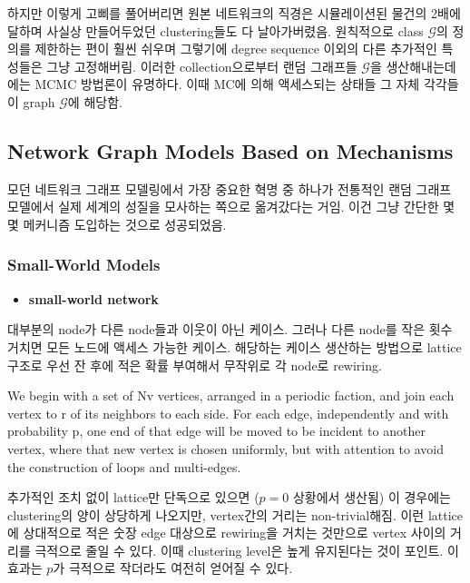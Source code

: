 \documentclass[
]{book}
\providecommand{\tightlist}{%
  \setlength{\itemsep}{0pt}\setlength{\parskip}{0pt}}
\begin{document}
{{{하지만 이렇게 고삐를 풀어버리면 원본 네트워크의 직경은 시뮬레이션된 물건의 2배에 달하며 사실상 만들어두었던 clustering들도 다 날아가버렸음. 원칙적으로 class \(\mathcal G\)의 정의를 제한하는 편이 훨씬 쉬우며 그렇기에 degree sequence 이외의 다른 추가적인 특성들은 그냥 고정해버림. 이러한 collection으로부터 랜덤 그래프들 \(\mathcal G\)을 생산해내는데에는 MCMC 방법론이 유명하다. 이때 MC에 의해 액세스되는 상태들 그 자체 각각들이 graph \(\mathcal G\)에 해당함.

\hypertarget{network-graph-models-based-on-mechanisms}{%
\subsection{Network Graph Models Based on Mechanisms}\label{network-graph-models-based-on-mechanisms}}

모던 네트워크 그래프 모델링에서 가장 중요한 혁명 중 하나가 전통적인 랜덤 그래프 모델에서 실제 세계의 성질을 모사하는 쪽으로 옮겨갔다는 거임. 이건 그냥 간단한 몇몇 메커니즘 도입하는 것으로 성공되었음.

\hypertarget{small-world-models}{%
\subsubsection{Small-World Models}\label{small-world-models}}

\begin{itemize}
\tightlist
\item
  \textbf{small-world network}
\end{itemize}

대부분의 node가 다른 node들과 이웃이 아닌 케이스. 그러나 다른 node를 작은 횟수 거치면 모든 노드에 액세스 가능한 케이스. 해당하는 케이스 생산하는 방법으로 lattice 구조로 우선 잔 후에 적은 확률 부여해서 무작위로 각 node로 rewiring.

We begin with a set of Nv vertices, arranged in a periodic faction, and join each vertex to r of its neighbors to each side. For each edge, independently and with probability p, one end of that edge will be moved to be incident to another vertex, where that new vertex is chosen uniformly, but with attention to avoid the construction of loops and multi-edges.

추가적인 조치 없이 lattice만 단독으로 있으면 (\(p=0\) 상황에서 생산됨) 이 경우에는 clustering의 양이 상당하게 나오지만, vertex간의 거리는 non-trivial해짐. 이런 lattice에 상대적으로 적은 숫장 edge 대상으로 rewiring을 거치는 것만으로 vertex 사이의 거리를 극적으로 줄일 수 있다. 이때 clustering level은 높게 유지된다는 것이 포인트. 이 효과는 \(p\)가 극적으로 작더라도 여전히 얻어질 수 있다.

}}}
\end{document}
